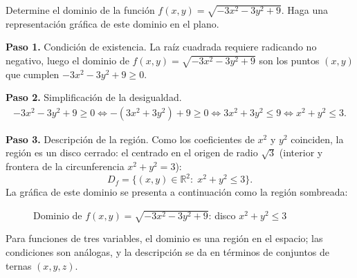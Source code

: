 \begin{prob}
Determine el dominio de la función $f(x,y)=\sqrt{-3x^2-3y^2+9}$. Haga una representación gráfica de este dominio en el plano.
\begin{myproof}
\textbf{Paso 1.} Condición de existencia. La raíz cuadrada requiere radicando no
negativo, luego el dominio de $f(x,y)=\sqrt{-3x^2-3y^2+9}$ son los puntos
$(x,y)$ que cumplen $-3x^2-3y^2+9\geq 0.$

\textbf{Paso 2.} Simplificación de la desigualdad.
\begin{align*}
-3x^2-3y^2+9\geq 0 \Leftrightarrow -(3x^2+3y^2)+9\geq 0 \Leftrightarrow 3x^2+3y^2\leq 9
\Leftrightarrow x^2+y^2\leq 3.
\end{align*}

\textbf{Paso 3.} Descripción de la región. Como los coeficientes de $x^2$ y
$y^2$ coinciden, la región es un disco cerrado: el centrado en el origen de
radio $\sqrt{3}$ (interior y frontera de la circunferencia $x^2+y^2=3$):
\[
  \boxed{D_f=\{(x,y)\in\mathbb{R}^2:\;x^2+y^2\leq 3\}.}
\]
La gráfica de este dominio se presenta a continuación como la región sombreada:
\begin{figure}[H]
\centering
{}
\caption{Dominio de $f(x,y)=\sqrt{-3x^2-3y^2+9}$: disco $x^2+y^2\leq 3$}
\label{fig:dom_circulo_3x2y2}
\end{figure}
\end{myproof}
\end{prob}

\begin{rem}
Para funciones de tres variables, el dominio es una región en el
espacio; las condiciones son análogas, y la descripción se da en
términos de conjuntos de ternas $(x,y,z)$.
\end{rem}

